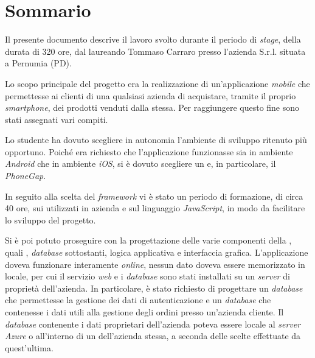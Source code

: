 
\cleardoublepage
{}
{}
\begingroup
\let\clearpage\relax
\let\cleardoublepage\relax
\let\cleardoublepage\relax

\chapter*{Sommario}

Il presente documento descrive il lavoro svolto durante il periodo di \textit{stage}, della durata di 320 ore, dal laureando Tommaso Carraro presso l'azienda \visione{} S.r.l. situata a Pernumia (PD).

Lo scopo principale del progetto era la realizzazione di un'applicazione \textit{mobile} che permettesse ai clienti di una qualsiasi azienda di acquistare, tramite il proprio \textit{smartphone}, dei prodotti venduti dalla stessa. Per raggiungere questo fine sono stati assegnati vari compiti.

Lo studente ha dovuto scegliere in autonomia l'ambiente di sviluppo ritenuto più opportuno. Poiché era richiesto che l'applicazione funzionasse sia in ambiente \textit{Android} che in ambiente \textit{iOS}, si è dovuto scegliere un  e, in particolare, il  \textit{PhoneGap}.

In seguito alla scelta del \textit{framework} vi è stato un periodo di formazione, di circa 40 ore, sui  utilizzati in azienda e sul linguaggio \textit{JavaScript}, in modo da facilitare lo sviluppo del progetto.

Si è poi potuto proseguire con la progettazione delle varie componenti della , quali , \textit{database} sottostanti, logica applicativa e interfaccia grafica. 
L'applicazione doveva funzionare interamente \textit{online}, nessun dato doveva essere memorizzato in locale, per cui il servizio \textit{web} e i \textit{database} sono stati installati su un \textit{server}  di proprietà dell'azienda.
In particolare, è stato richiesto di progettare un \textit{database} che permettesse la gestione dei dati di autenticazione e un \textit{database} che contenesse i dati utili alla gestione degli ordini presso un'azienda cliente. Il \textit{database} contenente i dati proprietari dell'azienda poteva essere locale al \textit{server Azure} o all'interno di un  dell'azienda stessa, a seconda delle scelte effettuate da quest'ultima.

